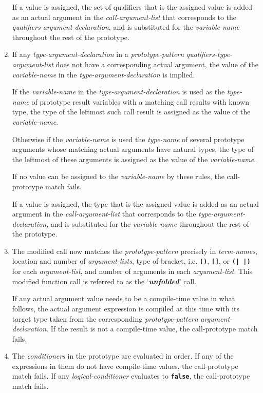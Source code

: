 \documentclass[12pt]{article}
\newcommand{\TT}[1]{{\tt \bfseries #1}}
\newcommand{\mkey}[2]{{\bf \em #1}\index{#1!#2}}
\begin{document}
\begin{enumerate}
If a value is assigned,
the set of qualifiers that is the assigned value
is added as an actual argument
in the {\em call-argument-list} that corresponds
to the {\em qualifiers-argument-declaration}, and
is substituted for the {\em variable-name} throughout the rest of the
prototype.

\item
If any {\em type-argument-declaration} in a {\em prototype-pattern}
{\em qualifiers-type-argument-list} does \underline{not} have
a corresponding actual argument, the value of the
{\em variable-name} in the {\em type-argument-declaration}
is implied.

If the {\em variable-name} in the {\em type-argument-declaration}
is used as the {\em type-name} of prototype result variables
with a matching call results with known type,
the type of the leftmost such call result is assigned as the
value of the {\em variable-name}.

Otherwise if the {\em variable-name}
is used the {\em type-name} of several prototype arguments whose matching
actual arguments have natural types, the type of the leftmost
of these arguments is assigned as the
value of the {\em variable-name}.

If no value can be assigned to the {\em variable-name} by these rules,
the call-prototype match fails.

If a value is assigned,
the type that is the assigned value is added as an actual argument
in the {\em call-argument-list} that corresponds
to the {\em type-argument-declaration}, and
is substituted for the {\em variable-name} throughout the rest of the
prototype.

\item
The modified call now matches the {\em prototype-pattern}
precisely in {\em term-names},
location and number of {\em argument-lists}, type of bracket, i.e. \TT{()},
\TT{[]}, or \TT{(|~|)} for each {\em argument-list}, and number of
arguments in each {\em argument-list}.
This modified function call is referred to as the
`\mkey{unfolded}{call}' call.

If any actual argument value needs to be a compile-time value in what
follows, the actual argument expression is compiled at this
time with its target type taken from the corresponding
{\em prototype-pattern} {\em argument-declaration}.
If the result is not a compile-time value, the call-prototype
match fails.

\item
The {\em conditioners} in the prototype are evaluated
in order.  If any of the expressions in them do not have compile-time
values, the call-prototype match fails.
If any {\em logical-conditioner} evaluates
to \TT{false}, the call-prototype match fails.


\end{enumerate}
\end{document}
